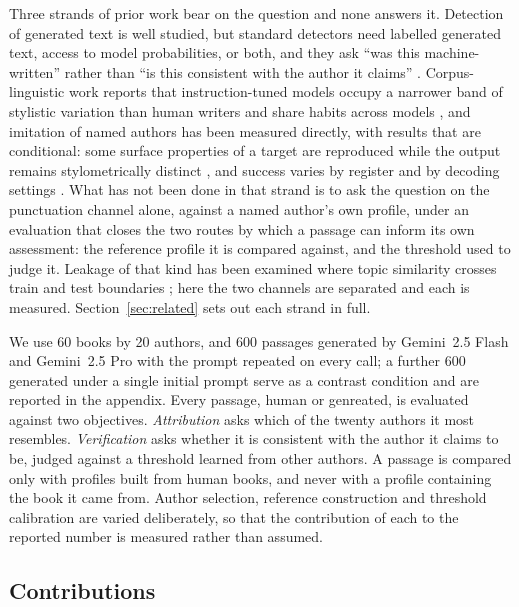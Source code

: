 \documentclass[11pt]{article}
\begin{document}
Three strands of prior work bear on the question and none answers it.
Detection of generated text is well studied, but standard detectors
need labelled generated text, access to model probabilities, or both,
and they ask ``was this machine-written'' rather than ``is this
consistent with the author it claims''
\cite{ippolito2020,mitchell2023,sadasivan2024}.  Corpus-linguistic work
reports that instruction-tuned models occupy a narrower band of
stylistic variation than human writers and share habits across models
\cite{milicka2025,reinhart2025}, and imitation of named authors has
been measured directly, with results that are conditional: some surface
properties of a target are reproduced while the output remains
stylometrically distinct \cite{mikros2025}, and success varies by
register \cite{wang2025} and by decoding settings \cite{milicka2025}.
What has not been done in that strand is to ask the question on the
punctuation channel alone, against a named author's own profile, under
an evaluation that closes the two routes by which a passage can inform
its own assessment: the reference profile it is compared against, and
the threshold used to judge it.  Leakage of that kind has been examined
where topic similarity crosses train and test boundaries
\cite{sawatphol2024}; here the two channels are separated and each is
measured.  Section~\ref{sec:related} sets out each strand in full.

We use 60 books by 20 authors, and 600 passages generated by
Gemini~2.5 Flash and Gemini~2.5 Pro with the prompt repeated on every
call; a further 600 generated under a single initial prompt serve as a
contrast condition and are reported in the appendix. Every passage, human or genreated,
is evaluated against two objectives.  \emph{Attribution} asks which of the
twenty authors it most resembles.  \emph{Verification} asks whether it
is consistent with the author it claims to be, judged against a
threshold learned from other authors.  A passage is compared only with
profiles built from human books, and never with a profile containing
the book it came from.  Author selection, reference construction and
threshold calibration are varied deliberately, so that the contribution
of each to the reported number is measured rather than assumed.

\subsection{Contributions}
\end{document}
